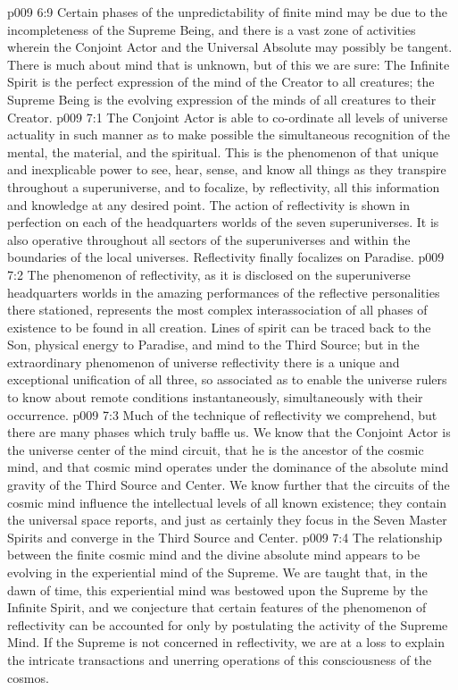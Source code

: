 \pc \vs p009 6:9 Certain phases of the unpredictability of finite mind may be due to the incompleteness of the Supreme Being, and there is a vast zone of activities wherein the Conjoint Actor and the Universal Absolute may possibly be tangent. There is much about mind that is unknown, but of this we are sure: The Infinite Spirit is the perfect expression of the mind of the Creator to all creatures; the Supreme Being is the evolving expression of the minds of all creatures to their Creator.\plusone
{}
\vs p009 7:1 The Conjoint Actor is able to co\hyp{}ordinate all levels of universe actuality in such manner as to make possible the simultaneous recognition of the mental, the material, and the spiritual. This is the phenomenon of  that unique and inexplicable power to see, hear, sense, and know all things as they transpire throughout a superuniverse, and to focalize, by reflectivity, all this information and knowledge at any desired point. The action of reflectivity is shown in perfection on each of the headquarters worlds of the seven superuniverses. It is also operative throughout all sectors of the superuniverses and within the boundaries of the local universes. Reflectivity finally focalizes on Paradise.
\vs p009 7:2 The phenomenon of reflectivity, as it is disclosed on the superuniverse headquarters worlds in the amazing performances of the reflective personalities there stationed, represents the most complex interassociation of all phases of existence to be found in all creation. Lines of spirit can be traced back to the Son, physical energy to Paradise, and mind to the Third Source; but in the extraordinary phenomenon of universe reflectivity there is a unique and exceptional unification of all three, so associated as to enable the universe rulers to know about remote conditions instantaneously, simultaneously with their occurrence.
\vs p009 7:3 Much of the technique of reflectivity we comprehend, but there are many phases which truly baffle us. We know that the Conjoint Actor is the universe center of the mind circuit, that he is the ancestor of the cosmic mind, and that cosmic mind operates under the dominance of the absolute mind gravity of the Third Source and Center. We know further that the circuits of the cosmic mind influence the intellectual levels of all known existence; they contain the universal space reports, and just as certainly they focus in the Seven Master Spirits and converge in the Third Source and Center.
\pc \vs p009 7:4 The relationship between the finite cosmic mind and the divine absolute mind appears to be evolving in the experiential mind of the Supreme. We are taught that, in the dawn of time, this experiential mind was bestowed upon the Supreme by the Infinite Spirit, and we conjecture that certain features of the phenomenon of reflectivity can be accounted for only by postulating the activity of the Supreme Mind. If the Supreme is not concerned in reflectivity, we are at a loss to explain the intricate transactions and unerring operations of this consciousness of the cosmos.
